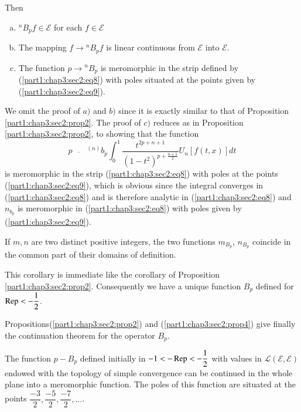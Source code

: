 Then\pageoriginale 
\begin{enumerate}[a)]
\item ${}^nB_{p}f \in \mathscr{E}$ for  each  $f \in \mathscr{E}$
\item The mapping $f \to {}^nB_{p}f$ is linear continuous from
  $\mathscr{E}$ into $\mathscr{E}$. 
\item The function $p \to {}^n B_{p}$ is meromorphic in the strip
  defined by (\ref{part1:chap3:sec2:eq8}) with poles situated at the
  points  given by (\ref{part1:chap3:sec2:eq9}).   
\end{enumerate}

We omit the proof of $a)$ and $b)$  since it is exactly similar to
that of Proposition \ref{part1:chap3:sec2:prop2}. The proof of $c)$
reduces as in Proposition \ref{part1:chap3:sec2:prop2}, to showing
that the function  
$$
p \overline{~~~~~~~}  ~ ^{(n)}b_{p}  \int^1_0
\frac{t^{2p+n+1}}{(1-t^2)^{p+\frac{n+1}{2}}} U_n \left[ f (t, x)
  \right] dt 
$$
is meromorphic in the strip (\ref{part1:chap3:sec2:eq8}) with poles at
the points (\ref{part1:chap3:sec2:eq9}), 
which is obvious since the integral converges in
(\ref{part1:chap3:sec2:eq8}) and is therefore
analytic in (\ref{part1:chap3:sec2:eq8}) and $n_{b_{p}}$ is
meromorphic in (\ref{part1:chap3:sec2:eq8}) with poles given by
(\ref{part1:chap3:sec2:eq9}).  

\begin{coro*}
  If $m, n$ are two distinct positive integers, the two functions
  $m_{B_{p}}$, $n_{B_{p}}$ coincide in the common part of their
  domains of definition. 
\end{coro*}

This corollary is immediate like the corollary of Proposition
\ref{part1:chap3:sec2:prop2}. Consequently we have a unique function
$B_{p}$ defined for $\operatorname{Rep} < - \dfrac{1}{2}$. 

Propositions\pageoriginale (\ref{part1:chap3:sec2:prop2}) and
(\ref{part1:chap3:sec2:prop4}) give finally the continuation theorem for
the operator $B_p$. 

\begin{theorem*}
  The function $p - B_p $ defined initially in $-1 < -\operatorname{Rep} <
  -\dfrac{1}{2}$ with values in $\mathscr{L} ( \mathscr{E},
  \mathscr{E})$ endowed with the  topology of simple convergence can
  be continued in the whole  plane into a meromorphic function. The
  poles of this function are situated at the points $\dfrac{-3}{2},
  \dfrac{-5}{2}, \dfrac{-7}{2},  \ldots $. 
\end{theorem*}

